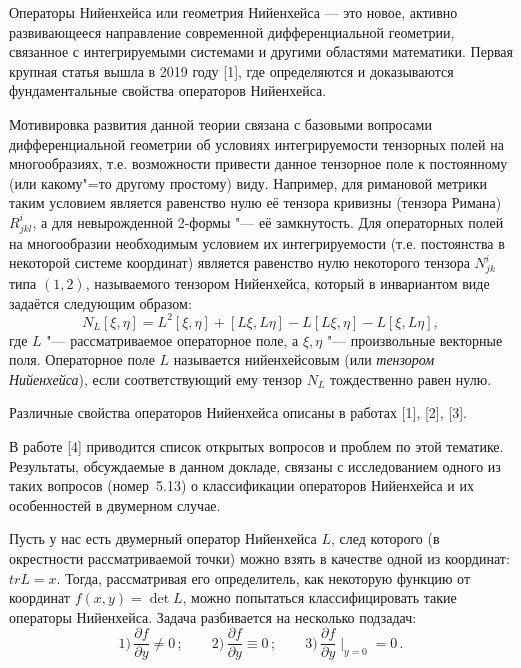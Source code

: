 
\vzmscaption

Операторы Нийенхейса или геометрия Нийенхейса --- это новое, активно развивающееся направление современной дифференциальной геометрии, связанное с интегрируемыми системами и другими областями математики.
Первая крупная статья вышла в 2019 году [1], где определяются и доказываются фундаментальные свойства операторов Нийенхейса.

Мотивировка развития данной теории связана с базовыми вопросами дифференциальной геометрии об условиях интегрируемости тензорных полей на многообразиях, т.е. возможности привести данное
тензорное поле к постоянному (или какому"=то другому простому) виду. Например, для римановой метрики таким условием является равенство нулю её тензора кривизны (тензора Римана) $R^i_{jkl}$,
а для невырожденной 2-формы "--- её замкнутость. Для операторных полей на многообразии необходимым условием их интегрируемости (т.е. постоянства в некоторой системе координат) является
равенство нулю некоторого тензора $N^i_{jk}$ типа $(1,2)$, называемого тензором Нийенхейса, который в инвариантом виде задаётся следующим образом:
\begin{equation*}
N_L [\xi, \eta] = L^2[\xi, \eta] + [L \xi, L \eta] - L[L \xi, \eta] - L[\xi, L \eta],
\end{equation*}
где $L$ "--- рассматриваемое операторное поле, а $\xi,\eta$ "--- произвольные векторные поля. Операторное поле $L$ называется нийенхейсовым (или \textit{тензором Нийенхейса}), если
соответствующий ему тензор $N_L$ тождественно равен нулю.

Различные свойства операторов Нийенхейса описаны в работах [1], [2], [3].

В работе [4] приводится список открытых вопросов и проблем по этой тематике. Результаты, обсуждаемые в данном докладе, связаны с исследованием одного из таких вопросов (номер~5.13)
о классификации операторов Нийенхейса и их особенностей в двумерном случае.

Пусть у нас есть двумерный оператор Нийенхейса $L$, след которого (в окрестности рассматриваемой точки) можно взять в качестве одной из координат: $tr L = x$.
Тогда, рассматривая его определитель, как некоторую функцию от координат $f(x,y)=\det L$, можно попытаться классифицировать такие операторы Нийенхейса.
Задача разбивается на несколько подзадач:
%
$$
1)\,\frac{\partial f}{\partial y} \neq 0    \,;\qquad
2)\,\frac{\partial f}{\partial y} \equiv 0  \,;\qquad
3)\,\frac{\partial f}{\partial y} \mid_{y = 0} = 0\,.
$$

